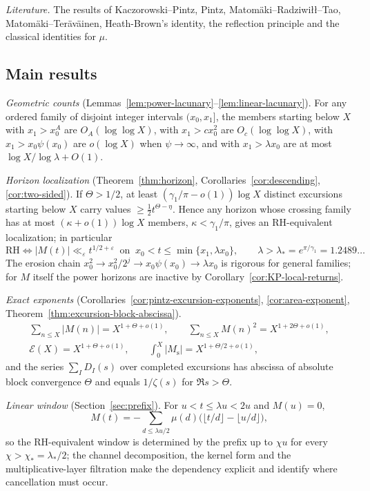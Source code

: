 \documentclass[11pt,reqno]{amsart}
\numberwithin{equation}{section}
\theoremstyle{plain}
\theoremstyle{definition}
\theoremstyle{remark}
\newcommand{\Ms}{M_{\mathrm{s}}}
\newcommand{\eps}{\varepsilon}
\newcommand{\En}{\mathcal{E}}
\begin{document}
\smallskip\noindent\emph{Literature.} The results of
Kaczorowski--Pintz, Pintz, Matomäki--Radziwiłł--Tao, Matomäki--Teräväinen,
Heath-Brown's identity, the reflection principle and the classical
identities for $\mu$.

\subsection{Main results}
\emph{Geometric counts} (Lemmas~\ref{lem:power-lacunary}--\ref{lem:linear-lacunary}).
For any ordered family of disjoint integer intervals $(x_0,x_1]$, the members
starting below $X$ with $x_1>x_0^A$ are $O_A(\log\log X)$, with $x_1>cx_0^2$
are $O_c(\log\log X)$, with $x_1>x_0\psi(x_0)$ are $o(\log X)$ when
$\psi\to\infty$, and with $x_1>\lambda x_0$ are at most
$\log X/\log\lambda+O(1)$.

\emph{Horizon localization} (Theorem~\ref{thm:horizon},
Corollaries~\ref{cor:descending}, \ref{cor:two-sided}). If $\Theta>1/2$, at
least $(\gamma_1/\pi-o(1))\log X$ distinct excursions starting below $X$
carry values $\ge\frac12t^{\Theta-\eta}$. Hence any horizon whose crossing
family has at most $(\kappa+o(1))\log X$ members, $\kappa<\gamma_1/\pi$, gives
an RH-equivalent localization; in particular
\begin{equation}
\mathrm{RH}\iff |M(t)|\ll_\eps t^{1/2+\eps}\ \text{ on }\
x_0<t\le\min\{x_1,\lambda x_0\},\qquad \lambda>\lambda_*=e^{\pi/\gamma_1}=1.2489\ldots
\end{equation}
The erosion chain $x_0^2\to x_0^2/2^j\to x_0\psi(x_0)\to\lambda x_0$ is
rigorous for general families; for $M$ itself the power horizons are
inactive by Corollary~\ref{cor:KP-local-returns}.

\emph{Exact exponents} (Corollaries~\ref{cor:pintz-excursion-exponents},
\ref{cor:area-exponent}, Theorem~\ref{thm:excursion-block-abscissa}).
\begin{gather}
\sum_{n\le X}|M(n)|=X^{1+\Theta+o(1)},\qquad \sum_{n\le X}M(n)^2=X^{1+2\Theta+o(1)},\\
\En(X)=X^{1+\Theta+o(1)},\qquad \int_0^X|\Ms|=X^{1+\Theta/2+o(1)},
\end{gather}
and the series $\sum_I D_I(s)$ over completed excursions has abscissa of
absolute block convergence $\Theta$ and equals $1/\zeta(s)$ for
$\Re s>\Theta$.

\emph{Linear window} (Section~\ref{sec:prefix}). For $u<t\le\lambda u<2u$ and
$M(u)=0$,
\begin{equation}
M(t)=-\sum_{d\le\lambda u/2}\mu(d)\bigl(\lfloor t/d\rfloor-\lfloor u/d\rfloor\bigr),
\end{equation}
so the RH-equivalent window is determined by the prefix up to $\chi u$ for
every $\chi>\chi_*=\lambda_*/2$; the channel decomposition, the kernel form
and the multiplicative-layer filtration make the dependency explicit and
identify where cancellation must occur.
\end{document}
